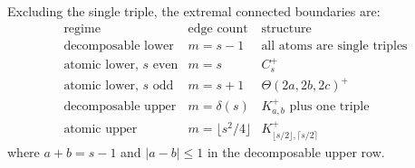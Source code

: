 \begin{corollary}
Excluding the single triple, the extremal connected boundaries are:
\[
\begin{array}{c|c|c}
\text{regime} & \text{edge count} & \text{structure}\\ \hline
\text{decomposable lower} & m=s-1
  & \text{all atoms are single triples}\\
\text{atomic lower, }s\text{ even} & m=s
  & C_s^+\\
\text{atomic lower, }s\text{ odd} & m=s+1
  & \Theta(2a,2b,2c)^+\\
\text{decomposable upper} & m=\delta(s)
  & K_{a,b}^+\text{ plus one triple}\\
\text{atomic upper} & m=\lfloor s^2/4\rfloor
  & K_{\lfloor s/2\rfloor,\lceil s/2\rceil}^+
\end{array}
\]
where \(a+b=s-1\) and \(|a-b|\le1\) in the decomposable upper row.
\end{corollary}
